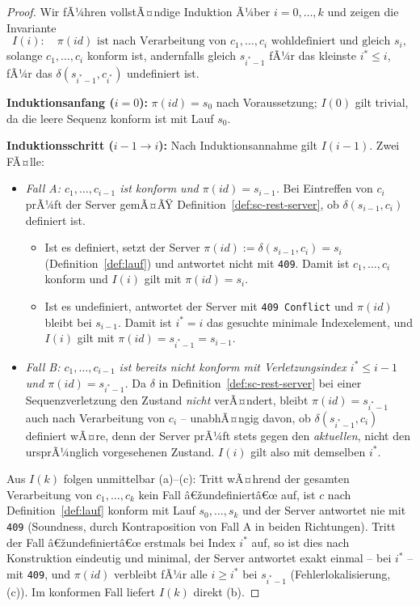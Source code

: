 ﻿\documentclass[a4paper,12pt]{article}
\theoremstyle{definition}
\begin{document}
\begin{proof}
	Wir fÃ¼hren vollstÃ¤ndige Induktion Ã¼ber $i=0,\ldots,k$ und zeigen die Invariante
	\[
		I(i):\quad \pi(id) \text{ ist nach Verarbeitung von } c_1,\ldots,c_i
		\text{ wohldefiniert und gleich } s_i,
	\]
	solange $c_1,\ldots,c_i$ konform ist, andernfalls gleich $s_{i^\ast-1}$ fÃ¼r das
	kleinste $i^\ast \le i$, fÃ¼r das $\delta(s_{i^\ast-1},c_{i^\ast})$ undefiniert ist.

	\textbf{Induktionsanfang ($i=0$):} $\pi(id)=s_0$ nach Voraussetzung; $I(0)$ gilt
	trivial, da die leere Sequenz konform ist mit Lauf $s_0$.

	\textbf{Induktionsschritt ($i-1 \to i$):} Nach Induktionsannahme gilt $I(i-1)$.
	Zwei FÃ¤lle:
	\begin{itemize}
		\item \emph{Fall A: $c_1,\ldots,c_{i-1}$ ist konform und $\pi(id)=s_{i-1}$.}
		      Bei Eintreffen von $c_i$ prÃ¼ft der Server gemÃ¤ÃŸ
		      Definition~\ref{def:sc-rest-server}, ob $\delta(s_{i-1},c_i)$ definiert ist.
		      \begin{itemize}
			      \item Ist es definiert, setzt der Server $\pi(id):=\delta(s_{i-1},c_i)=s_i$
			            (Definition~\ref{def:lauf}) und antwortet nicht mit \texttt{409}.
			            Damit ist $c_1,\ldots,c_i$ konform und $I(i)$ gilt mit $\pi(id)=s_i$.
			      \item Ist es undefiniert, antwortet der Server mit \texttt{409 Conflict}
			            und $\pi(id)$ bleibt bei $s_{i-1}$. Damit ist $i^\ast = i$ das
			            gesuchte minimale Indexelement, und $I(i)$ gilt mit
			            $\pi(id)=s_{i^\ast-1}=s_{i-1}$.
		      \end{itemize}
		\item \emph{Fall B: $c_1,\ldots,c_{i-1}$ ist bereits nicht konform mit
		      Verletzungsindex $i^\ast \le i-1$ und $\pi(id)=s_{i^\ast-1}$.} Da $\delta$ in
		      Definition~\ref{def:sc-rest-server} bei einer Sequenzverletzung den Zustand
		      \emph{nicht} verÃ¤ndert, bleibt $\pi(id)=s_{i^\ast-1}$ auch nach Verarbeitung
		      von $c_i$ -- unabhÃ¤ngig davon, ob $\delta(s_{i^\ast-1},c_i)$ definiert wÃ¤re,
		      denn der Server prÃ¼ft stets gegen den \emph{aktuellen}, nicht den
		      ursprÃ¼nglich vorgesehenen Zustand. $I(i)$ gilt also mit demselben $i^\ast$.
	\end{itemize}

	Aus $I(k)$ folgen unmittelbar (a)--(c): Tritt wÃ¤hrend der gesamten Verarbeitung von
	$c_1,\ldots,c_k$ kein Fall â€žundefiniertâ€œ auf, ist $c$ nach Definition~\ref{def:lauf}
	konform mit Lauf $s_0,\ldots,s_k$ und der Server antwortet nie mit \texttt{409}
	(Soundness, durch Kontraposition von Fall A in beiden Richtungen).
	Tritt der Fall â€žundefiniertâ€œ erstmals bei Index $i^\ast$ auf, so ist dies nach
	Konstruktion eindeutig und minimal, der Server antwortet exakt einmal -- bei
	$i^\ast$ -- mit \texttt{409}, und $\pi(id)$ verbleibt fÃ¼r alle $i \ge i^\ast$ bei
	$s_{i^\ast-1}$ (Fehlerlokalisierung, (c)). Im konformen Fall liefert $I(k)$ direkt
	(b). \qedhere
\end{proof}
\end{document}
